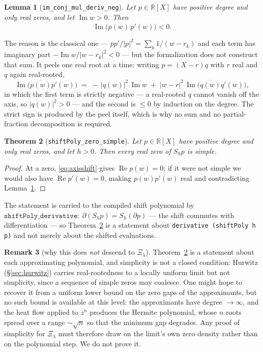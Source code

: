 \documentclass[11pt]{article}
\newtheorem{theorem}{Theorem}
\newtheorem{lemma}[theorem]{Lemma}
\theoremstyle{definition}
\newtheorem{remark}[theorem]{Remark}
\DeclareMathOperator{\Imop}{Im}
\DeclareMathOperator{\Reop}{Re}
\begin{document}
\begin{lemma}[\texttt{im\_conj\_mul\_deriv\_neg}]\label{lem:herglotz}
Let $p\in\mathbb R[X]$ have positive degree and only real zeros, and let $\Imop w>0$.  Then
\[
  \Imop\bigl(\overline{p(w)}\,p'(w)\bigr)<0 .
\]
\end{lemma}

The reason is the classical one --- $\overline{p}p'/|p|^{2}=\sum_k 1/(w-r_k)$ and each term has
imaginary part $-\Imop w/|w-r_k|^{2}<0$ --- but the formalization does not construct that sum.  It
peels one real root at a time: writing $p=(X-r)q$ with $r$ real and $q$ again real-rooted,
\begin{equation}\label{eq:peel}
  \Imop\bigl(\overline{p(w)}p'(w)\bigr)
  \;=\;-\,|q(w)|^{2}\,\Imop w\;+\;|w-r|^{2}\,\Imop\bigl(\overline{q(w)}q'(w)\bigr),
\end{equation}
in which the first term is strictly negative --- a real-rooted $q$ cannot vanish off the axis, so
$|q(w)|^{2}>0$ --- and the second is $\le0$ by induction on the degree.  The strict sign is produced by
the peel itself, which is why no sum and no partial-fraction decomposition is required.

\begin{theorem}[\texttt{shiftPoly\_zero\_simple}]\label{thm:simple}
Let $p\in\mathbb R[X]$ have positive degree and only real zeros, and let $h>0$.  Then every real zero
of $S_hp$ is simple.
\end{theorem}

\begin{proof}
At a zero, \eqref{eq:axisshift} gives $\Reop p(w)=0$; if it were not simple we would also have
$\Reop p'(w)=0$, making $\overline{p(w)}p'(w)$ real and contradicting Lemma~\ref{lem:herglotz}.
\end{proof}

The statement is carried to the compiled shift polynomial by
$\texttt{shiftPoly\_derivative}:\ \partial(S_hp)=S_h(\partial p)$ --- the shift commutes with
differentiation --- so Theorem~\ref{thm:simple} is a statement about
\texttt{derivative (shiftPoly h p)} and not merely about the shifted evaluations.

\begin{remark}[why this does \emph{not} descend to $\Xi_\lambda$]\label{rem:nodescend}
Theorem~\ref{thm:simple} is a statement about each approximating polynomial, and simplicity is not a
closed condition: Hurwitz (\S\ref{sec:hurwitz}) carries real-rootedness to a locally uniform limit but
not simplicity, since a sequence of simple zeros may coalesce.  One might hope to recover it from a
uniform lower bound on the zero gaps of the approximants, but no such bound is available at this
level: the approximants have degree $\to\infty$, and the heat flow applied to $z^{n}$ produces the
Hermite polynomial, whose $n$ roots spread over a range $\sim\sqrt n$ so that the minimum gap
degrades.  Any proof of simplicity for $\Xi_\lambda$ must therefore draw on the limit's own zero
density rather than on the polynomial step.  We do not prove it.
\end{remark}
\end{document}

